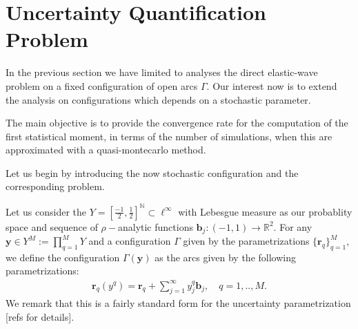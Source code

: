 \documentclass{article}
\newtheorem{theorem}{Theorem}[section]
\newtheorem{remark}[theorem]{Remark}
\newcommand{\todo}[1]{{\color{red}[#1]}}
\newcommand{\IN}{{\mathbb N}}
\newcommand{\IR}{{\mathbb R}}
\begin{document}
%
%
%
%
	\section{Uncertainty Quantification Problem}

In the previous section we have limited to analyses the direct elastic-wave problem on a fixed configuration of open arcs $\Gamma$. Our interest now is to extend the analysis on configurations which depends on a stochastic parameter. 

The main objective is to provide the convergence rate for the computation of the first statistical moment, in terms of the number of simulations, when this are approximated with a quasi-montecarlo method. 

Let us begin by introducing the now stochastic configuration and the corresponding problem.  

Let us consider the $Y = \left[\frac{-1}{2}, \frac{1}{2}\right]^{\IN} \subset \ell^\infty$ with Lebesgue measure as our probablity space and sequence of $\rho-$analytic functions $\mathbf{b}_j : (-1,1) \rightarrow \IR^2$. For any $\mathbf{y} \in Y^M:= \prod_{q =1}^M Y$ and a configuration $\Gamma$ given by the parametrizations $\{\mathbf{r}_q\}_{q=1}^M$, we define the configuration $\Gamma(\mathbf{y})$ as the arcs given by the following parametrizations: 
\begin{align*}
\mathbf{r}_q(y^q) =  \mathbf{r}_q+ 
\sum_{j=1}^{\infty} y^q_j \mathbf{b}_j,  \quad q= 1,..,M.
\end{align*}
We remark that this is a fairly standard form for the uncertainty parametrization \todo{refs for details}. 
\end{document}
